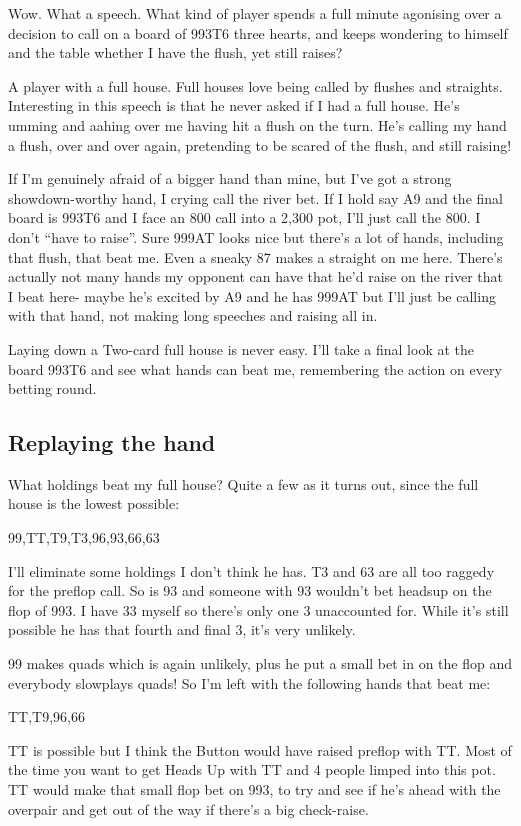 Wow. What a speech. What kind of player spends a full minute agonising
over a decision to call on a board of 993T6 three hearts, and keeps
wondering to himself and the table whether I have the flush, yet still
raises?

A player with a full house. Full houses love being called by flushes
and straights. Interesting in this speech is that he never asked
if I had a full house. He's umming and aahing over me having
hit a flush on the turn. He's calling my hand a flush, over and over
again, pretending to be scared of the flush, and still raising!

If I'm genuinely afraid of a bigger hand than mine, but I've
got a strong showdown-worthy hand, I crying call the river bet.
If I hold say A9 and the final board is 993T6 and I face an 800 call into
a 2,300 pot, I'll just call the 800. I don't ``have to raise''. Sure 999AT
looks nice but there's a lot of hands, including that flush, that beat me.
Even a sneaky 87 makes a straight on me here. There's actually not many
hands my opponent can have that he'd raise on the river that I beat here- maybe
he's excited by A9 and he has 999AT but I'll just be calling with that hand,
not making long speeches and raising all in.

Laying down a Two-card full house is never easy. I'll take a final look
at the board 993T6 and see what hands can beat me, remembering the
action on every betting round.

\subsection{Replaying the hand}

What holdings beat my full house? Quite a few as it turns out, since
the full house is the lowest possible:

99,TT,T9,T3,96,93,66,63

I'll eliminate some holdings I don't think he has. T3 and 63 are
all too raggedy for the preflop call. So is 93 and someone with 93
wouldn't bet headsup on the flop of 993. I have 33 myself so there's
only one 3 unaccounted for. While it's still possible he has that
fourth and final 3, it's very unlikely.

99 makes quads which is again unlikely, plus he put a small bet in
on the flop and everybody slowplays quads! So I'm left with the following
hands that beat me:

TT,T9,96,66

TT is possible but I think the Button would have raised preflop with TT.
Most of the time you want to get Heads Up with TT and 4 people limped
into this pot. TT would make that small flop bet on 993, to try and see
if he's ahead with the overpair and get out of the way if there's a big
check-raise.

